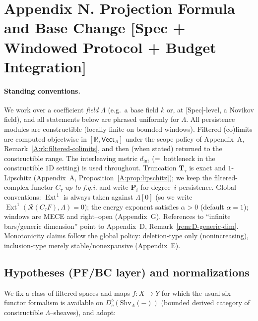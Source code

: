 \documentclass[11pt]{article}
\numberwithin{equation}{section}
\theoremstyle{plain}
\theoremstyle{definition}
\theoremstyle{remark}
\DeclareMathOperator{\Ext}{Ext}
\DeclareRobustCommand{\hyp}{\nobreakdash-}
\theoremstyle{plain}
\theoremstyle{definition}
\numberwithin{equation}{section}
\theoremstyle{definition}
\numberwithin{equation}{section}
\theoremstyle{plain}
\theoremstyle{definition}
\theoremstyle{remark}
\begin{document}
\section*{Appendix N. Projection Formula and Base Change [Spec + Windowed Protocol + Budget Integration]}
{}
\label{N:pf-bc}

\paragraph{Standing conventions.}
We work over a coefficient \emph{field} \(\Lambda\) (e.g.\ a base field \(k\) or, at [Spec]-level, a Novikov field), and all statements below are phrased uniformly for \(\Lambda\).
All persistence modules are constructible (locally finite on bounded windows).
Filtered (co)limits are computed objectwise in \([\mathbb{R},\mathsf{Vect}_\Lambda]\) under the scope policy of Appendix~A, Remark~\ref{A:rk:filtered-colimits}, and then (when stated) returned to the constructible range.
The interleaving metric \(d_{\mathrm{int}}\) (=\ bottleneck in the constructible \(1\)D setting) is used throughout.
Truncation \(\mathbf{T}_\tau\) is exact and \(1\)\hyp Lipschitz (Appendix~A, Proposition~\ref{A:prop:lipschitz}); we keep the filtered-complex functor \(C_\tau\) \emph{up to f.q.i.} and write \(\mathbf{P}_i\) for degree–\(i\) persistence.
Global conventions: \(\Ext^1\) is always taken against \(\Lambda[0]\) (so we write \(\Ext^1(\mathcal{R}(C_\tau F),\Lambda)=0\)); the energy exponent satisfies \(\alpha>0\) (default \(\alpha=1\)); windows are MECE and right–open (Appendix~G).
References to “infinite bars/generic dimension” point to Appendix~D, Remark~\ref{rem:D-generic-dim}.
Monotonicity claims follow the global policy: deletion-type only (nonincreasing), inclusion-type merely stable/nonexpansive (Appendix~E).

\setcounter{subsection}{0}
\renewcommand\thesubsection{N.\arabic{subsection}}
\makeatletter
\renewcommand\@seccntformat[1]{\csname the#1\endcsname.\quad}
\makeatother

\subsection{Hypotheses (PF/BC layer) and normalizations}
\label{N:hyp}
We fix a class of filtered spaces and maps \(f:X\to Y\) for which the usual six–functor formalism is available on
\(D^b_c(\mathrm{Shv}_\Lambda(-))\) (bounded derived category of constructible \(\Lambda\)–sheaves), and adopt:
\end{document}
